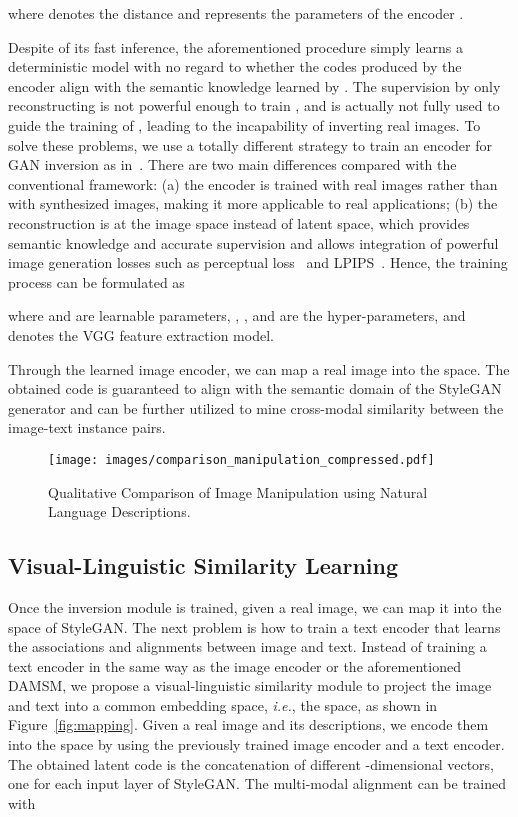 \documentclass[final]{cvpr}
\def\ie{\emph{i.e.}}
\begin{document}
where  denotes the  distance and  represents the parameters of the encoder .

Despite of its fast inference, the aforementioned procedure simply learns a deterministic model with no regard to whether the codes produced by the encoder align with the semantic knowledge learned by .
The supervision by only reconstructing  is not powerful enough to train , and  is actually not fully used to guide the training of , leading to the incapability of inverting real images.
To solve these problems, we use a totally different strategy to train an encoder for GAN inversion as in~\cite{zhu2020indomain}. 
There are two main differences compared with the conventional framework:
(a) the encoder is trained with real images rather than with synthesized images, making it more applicable to real applications;  
(b) the reconstruction is at the image space instead of latent space, which provides semantic knowledge and accurate supervision and allows integration of powerful image generation losses such as perceptual loss~\cite{johnson2016perceptual} and LPIPS~\cite{zhang2018unreasonable}.
Hence, the training process can be formulated as
\begin{small}

\end{small}
where  and  are learnable parameters, 
, , and  are the hyper-parameters,
and  denotes the VGG feature extraction model.

Through the learned image encoder, we can map a real image into the  space.
The obtained code is guaranteed to align with the semantic domain of the StyleGAN generator and can be further utilized to mine cross-modal similarity between the image-text instance pairs.

\begin{figure*}[ht]
\centering
\texttt{[image: images/comparison\_manipulation\_compressed.pdf]}
\caption{Qualitative Comparison of Image Manipulation using Natural Language Descriptions.}
\label{fig:comp_man}
\end{figure*}

\subsection{Visual-Linguistic Similarity Learning}
\label{subsec:vls-model}

Once the inversion module is trained, given a real image, we can map it into the  space of StyleGAN. 
The next problem is how to train a text encoder that learns the associations and alignments between image and text.
Instead of training a text encoder in the same way as the image encoder or the aforementioned DAMSM, we propose a visual-linguistic similarity module to project the image and text into a common embedding space, \ie, the  space, as shown in Figure~\ref{fig:mapping}.
Given a real image and its descriptions, we encode them into the  space by using the previously trained image encoder and a text encoder. 
The obtained latent code is the concatenation of  different -dimensional  vectors, one for each input layer of StyleGAN.
The multi-modal alignment can be trained with 
\end{document}

